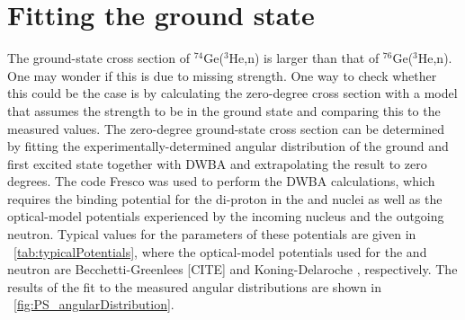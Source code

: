 \section{Fitting the \zp ground state}

The ground-state cross section of $^{74}$Ge($^3$He,n) is larger than that of $^{76}$Ge($^3$He,n).  One may wonder if this is due to missing \zp strength.  One way to check whether this could be the case is by calculating the zero-degree cross section with a model that assumes the \zp strength to be in the ground state and comparing this to the measured values.  The zero-degree ground-state cross section can be determined by fitting the experimentally-determined angular distribution of the ground and first excited state together with DWBA and extrapolating the result to zero degrees.  The code Fresco \cite{Fresco} was used to perform the DWBA calculations, which requires the binding potential for the di-proton in the  and  nuclei as well as the optical-model potentials experienced by the incoming  nucleus and the outgoing neutron.  Typical values for the parameters of these potentials are given in {\tab}~\ref{tab:typicalPotentials}, where the optical-model potentials used for the  and neutron are Becchetti-Greenlees [CITE] and Koning-Delaroche \cite{Koning_neutronPotential}, respectively.  The results of the fit to the measured angular distributions are shown in {\fig}~\ref{fig:PS_angularDistribution}.

